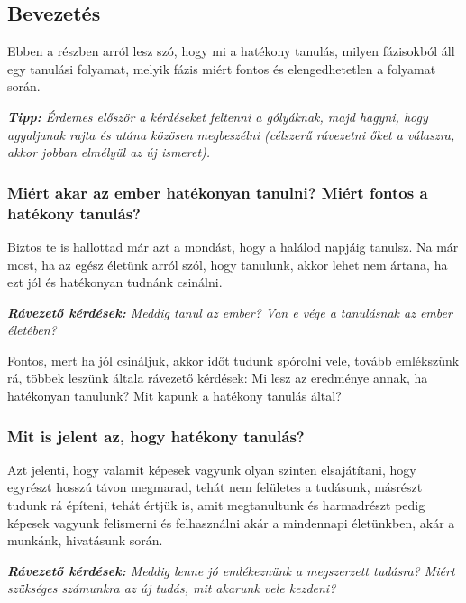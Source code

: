 \documentclass[../Main.tex]{subfiles}
\begin{document}
\subsection{Bevezetés}

\begin{flushleft}
    Ebben a részben arról lesz szó, hogy mi a hatékony tanulás, milyen fázisokból áll egy tanulási folyamat,
    melyik fázis miért fontos és elengedhetetlen a folyamat során.
\end{flushleft}


\textit{\textbf{Tipp:} Érdemes először a kérdéseket feltenni a gólyáknak, majd hagyni, hogy agyaljanak rajta és utána közösen megbeszélni (célszerű rávezetni őket a válaszra, akkor jobban elmélyül az új ismeret).
}

\subsubsection{Miért akar az ember hatékonyan tanulni? \newline Miért fontos a hatékony tanulás?}

\begin{flushleft}
    Biztos te is hallottad már azt a mondást, hogy a halálod napjáig tanulsz.
    Na már most, ha az egész életünk arról szól, hogy tanulunk, akkor lehet nem ártana,
    ha ezt jól és hatékonyan tudnánk csinálni.
\end{flushleft}

    \textit{\textbf{Rávezető kérdések:} Meddig tanul az ember? Van e vége a tanulásnak az ember életében?}

\begin{flushleft}
    Fontos, mert ha jól csináljuk, akkor időt tudunk spórolni vele, tovább emlékszünk rá, többek leszünk általa
    rávezető kérdések: Mi lesz az eredménye annak, ha hatékonyan tanulunk? Mit kapunk a hatékony tanulás által?
\end{flushleft}
    
\subsubsection{Mit is jelent az, hogy hatékony tanulás?}

\begin{flushleft}
    Azt jelenti, hogy valamit képesek vagyunk olyan szinten elsajátítani, hogy egyrészt hosszú távon megmarad,
    tehát nem felületes a tudásunk, másrészt tudunk rá építeni, tehát értjük is,
    amit megtanultunk és harmadrészt pedig képesek vagyunk felismerni és felhasználni akár a mindennapi életünkben,
    akár a munkánk, hivatásunk során.
\end{flushleft}

\textit{\textbf{Rávezető kérdések:} Meddig lenne jó emlékeznünk a megszerzett tudásra? Miért szükséges számunkra az új tudás, mit akarunk vele kezdeni?}
\end{document}
